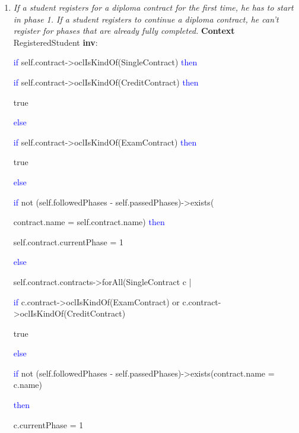 \begin{enumerate}
	\item \emph{If a student registers for a diploma contract for the first time,
	he has to start in phase 1. If a student registers to continue a diploma
	contract, he can't register for phases that are already fully completed.}
	\npar \textbf{Context} RegisteredStudent \textbf{inv}:
	\par \hspace*{5 mm} \textcolor{Blue}{if}
	self.contract->oclIsKindOf(SingleContract) \textcolor{Blue}{then}
	\par \hspace*{10 mm} \textcolor{Blue}{if}
	self.contract->oclIsKindOf(CreditContract) \textcolor{Blue}{then} 
	\par \hspace*{15 mm} true
	\par \hspace*{10 mm} \textcolor{Blue}{else}
	\par \hspace*{15 mm} \textcolor{Blue}{if}
	self.contract->oclIsKindOf(ExamContract) \textcolor{Blue}{then} 
	\par \hspace*{20 mm} true
	\par \hspace*{15 mm} \textcolor{Blue}{else}
	\par \hspace*{20 mm} \textcolor{Blue}{if} not (self.followedPhases -
	self.passedPhases)->exists(
	\par \hspace*{20 mm} contract.name = self.contract.name)
	\textcolor{Blue}{then}
	\par \hspace*{25 mm} self.contract.currentPhase = 1 
	
	\par \hspace*{5 mm} \textcolor{Blue}{else}
	\par \hspace*{10 mm} self.contract.contracts->forAll(SingleContract c |
	\par \hspace*{15 mm} \textcolor{Blue}{if} c.contract->oclIsKindOf(ExamContract)
	or c.contract->oclIsKindOf(CreditContract)
	\par \hspace*{20 mm} true
	\par \hspace*{15 mm} \textcolor{Blue}{else} 
	\par \hspace*{20 mm}\textcolor{Blue}{if} not (self.followedPhases -
	self.passedPhases)->exists(contract.name = c.name)
	\par \hspace*{20 mm} \textcolor{Blue}{then}
	\par \hspace*{25 mm} c.currentPhase = 1 
	
	
\end{enumerate}

